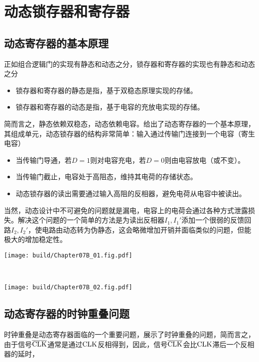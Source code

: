 \section{动态锁存器和寄存器}

\subsection{动态寄存器的基本原理}
正如组合逻辑门的实现有静态和动态之分，锁存器和寄存器的实现也有静态和动态之分
\begin{itemize}
    \item 锁存器和寄存器的静态是指，基于双稳态原理实现的存储。
    \item 锁存器和寄存器的动态是指，基于电容的充放电实现的存储。
\end{itemize}
简而言之，静态依赖双稳态，动态依赖电容。给出了动态寄存器的一个基本原理，其组成单元，动态锁存器的结构非常简单：输入通过传输门连接到一个电容（寄生电容）
\begin{itemize}
    \item 当传输门导通，若$D=1$则对电容充电，若$D=0$则由电容放电（或不变）。
    \item 当传输门截止，电容处于高阻态，维持其电荷的存储状态。
    \item 动态锁存器的读出需要通过输入高阻的反相器，避免电荷从电容中被读出。
\end{itemize}
当然，动态设计中不可避免的问题就是漏电，电容上的电荷会通过各种方式泄露损失。解决这个问题的一个简单的方法是为读出反相器$I_1,I_1'$添加一个很弱的反馈回路$I_2,I_2'$，使电路由动态转为伪静态，这会略微增加开销并面临类似的问题，但能极大的增加稳定性。

\begin{Figure}[动态寄存器]
    \begin{FigureSub}[动态;动态寄存器动态]
        \texttt{[image: build/Chapter07B\_01.fig.pdf]}
    \end{FigureSub}\\ \vspace{0.5cm}
    \begin{FigureSub}
        \texttt{[image: build/Chapter07B\_02.fig.pdf]}
    \end{FigureSub}
\end{Figure}

\subsection{动态寄存器的时钟重叠问题}
时钟重叠是动态寄存器面临的一个重要问题，展示了时钟重叠的问题，简而言之，由于信号$\CLK*$通常是通过$\CLK$反相得到，因此，信号$\CLK*$会比$\CLK$滞后一个反相器的延时，

